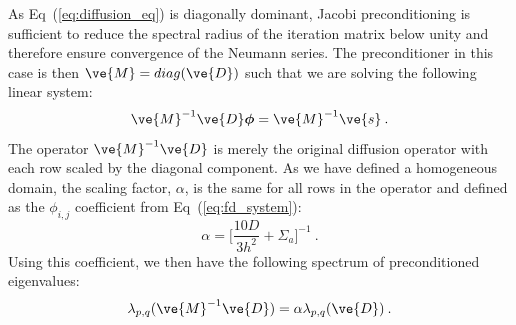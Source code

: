 \documentclass[preprint,11pt]{elsarticle}
\begin{document}
As Eq~(\ref{eq:diffusion_eq}) is diagonally dominant, Jacobi preconditioning
is sufficient to reduce the spectral radius of the iteration matrix below
unity and therefore ensure convergence of the Neumann series. The
preconditioner in this case is then $\ve{M} = diag(\ve{D})$ such that we are
solving the following linear system:
\begin{equation}
  \ve{M}^{-1} \ve{D} \boldsymbol{\phi} = \ve{M}^{-1} \ve{s}\:.
  \label{eq:precond_diffsion}
\end{equation}
The operator $\ve{M}^{-1} \ve{D}$ is merely the original diffusion operator
with each row scaled by the diagonal component. As we have defined a
homogeneous domain, the scaling factor, $\alpha$, is the same for all rows in
the operator and defined as the $\phi_{i,j}$ coefficient from
Eq~(\ref{eq:fd_system}):
\begin{equation}
  \alpha = \Bigg[\frac{10 D}{3 h^2} + \Sigma_a\Bigg]^{-1}\:.
  \label{eq:jacobi_scaling}
\end{equation}
Using this coefficient, we then have the following spectrum of
preconditioned eigenvalues:
\begin{equation}
  \lambda_{p,q}(\ve{M}^{-1} \ve{D}) = \alpha \lambda_{p,q}(\ve{D})\:.
  \label{eq:preconditioned_eigenvalues}
\end{equation}
\end{document}
